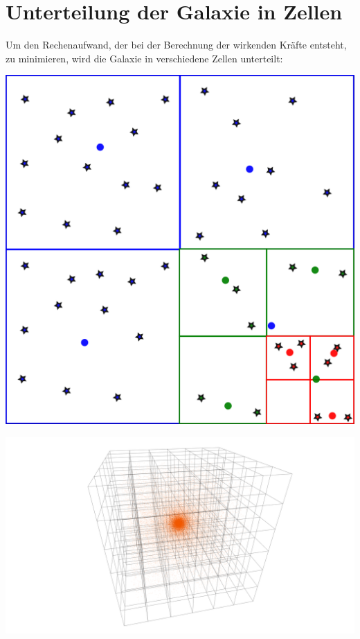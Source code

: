 \section*{Unterteilung der Galaxie in Zellen}

Um den Rechenaufwand, der bei der Berechnung der wirkenden Kräfte entsteht,
zu minimieren, wird die Galaxie in verschiedene Zellen unterteilt:

\begin{center}\vspace{1cm}
\includegraphics[width=0.8\linewidth]{figs/cells_2D}
\label{fig:galaxy_cells}
\end{center}

\begin{center}
\includegraphics[width=1\linewidth]{figs/cells}
\label{fig:galaxy_cells_3d}
\end{center}\vspace{-3cm}
